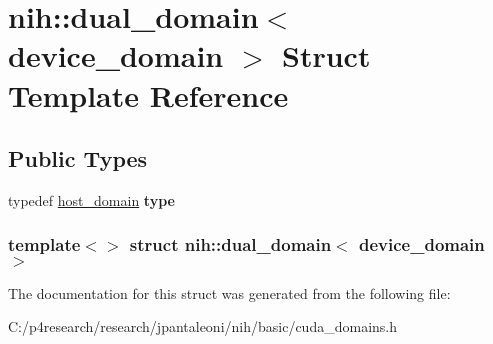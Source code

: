 \hypertarget{structnih_1_1dual__domain_3_01device__domain_01_4}{
\section{nih\-:\-:dual\-\_\-domain$<$ device\-\_\-domain $>$ \-Struct \-Template \-Reference}
\label{structnih_1_1dual__domain_3_01device__domain_01_4}
}
\subsection*{\-Public \-Types}
\begin{DoxyCompactItemize}
\item 
\hypertarget{structnih_1_1dual__domain_3_01device__domain_01_4_add83439996db222cc109114d5005ca09}{
typedef \hyperlink{structnih_1_1host__domain}{host\-\_\-domain} {\bfseries type}}
\label{structnih_1_1dual__domain_3_01device__domain_01_4_add83439996db222cc109114d5005ca09}

\end{DoxyCompactItemize}
\subsubsection*{template$<$$>$ struct nih\-::dual\-\_\-domain$<$ device\-\_\-domain $>$}



\-The documentation for this struct was generated from the following file\-:\begin{DoxyCompactItemize}
\item 
\-C\-:/p4research/research/jpantaleoni/nih/basic/cuda\-\_\-domains.\-h\end{DoxyCompactItemize}
